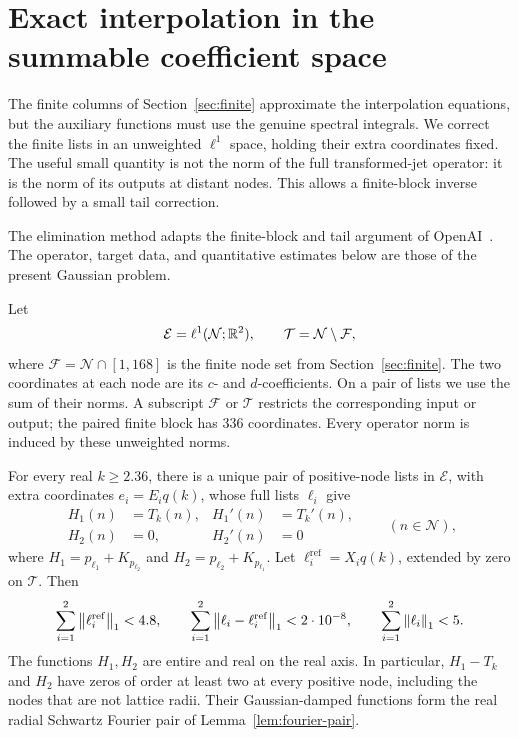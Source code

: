 \section{Exact interpolation in the summable coefficient space}
\label{sec:interpolation}

The finite columns of Section~\ref{sec:finite} approximate the interpolation
equations, but the auxiliary functions must use the genuine spectral
integrals.  We correct the finite lists in an unweighted \(\ell^1\) space,
holding their extra coordinates fixed.  The useful small quantity is not the
norm of the full transformed-jet operator: it is the norm of its outputs at
distant nodes.  This allows a finite-block inverse followed by a small tail
correction.

The elimination method adapts the finite-block and tail argument of
OpenAI~\citep[Section~3]{SharpPlanar2026}.  The operator, target data, and quantitative
estimates below are those of the present Gaussian problem.

Let
\[
 \mathcal E=\ell^1(\mathcal N;\mathbb R^2),\qquad
 \mathcal T=\mathcal N\setminus\mathcal F,
\]
where \(\mathcal F=\mathcal N\cap[1,168]\) is the finite node set from
Section~\ref{sec:finite}.  The two coordinates at each node are its \(c\)- and
\(d\)-coefficients.  On a pair of lists we use the sum of their norms.  A
subscript \(\mathcal F\) or \(\mathcal T\) restricts the corresponding input
or output; the paired finite block has 336 coordinates.  Every operator norm
is induced by these unweighted norms.

\begin{proposition}
\label{prop:exact-interpolation}
For every real \(k\ge2.36\), there is a unique pair of positive-node lists in
\(\mathcal E\), with extra coordinates \(e_i=E_iq(k)\), whose full lists
\(\ell_i\) give
\begin{equation}
 \begin{aligned}
 H_1(n)&=T_k(n),& H_1'(n)&=T_k'(n),\\
 H_2(n)&=0,& H_2'(n)&=0
 \end{aligned}
 \qquad(n\in\mathcal N),
 \label{eq:exact-jets}
\end{equation}
where \(H_1=p_{\ell_1}+K_{p_{\ell_2}}\) and
\(H_2=p_{\ell_2}+K_{p_{\ell_1}}\).  Let \(\ell_i^{\mathrm{ref}}=X_iq(k)\),
extended by zero on \(\mathcal T\).  Then
\begin{equation}
 \sum_{i=1}^2\left\lVert\ell_i^{\mathrm{ref}}\right\rVert_1<4.8,\qquad
 \sum_{i=1}^2\left\lVert\ell_i-\ell_i^{\mathrm{ref}}\right\rVert_1<2\cdot10^{-8},\qquad
 \sum_{i=1}^2\left\lVert\ell_i\right\rVert_1<5.
 \label{eq:exact-list-bounds}
\end{equation}
The functions \(H_1,H_2\) are entire and real on the real axis.  In
particular, \(H_1-T_k\) and \(H_2\) have zeros of order at least two at every
positive node, including the nodes that are not lattice radii.  Their
Gaussian-damped functions form the real radial Schwartz Fourier pair of
Lemma~\ref{lem:fourier-pair}.
\end{proposition}

